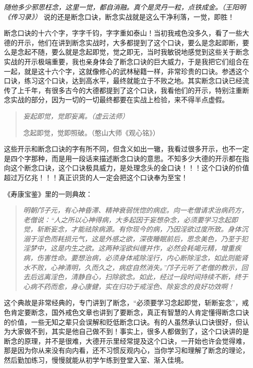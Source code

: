 \textit{随他多少邪思枉念，这里一觉，都自消融。真个是灵丹一粒，点铁成金。（王阳明《传习录》）} 说的还是断念口诀，断念实战就是这么干净利落，一觉，即胜！

断念口诀的十六个字，字字千钧，字字重如泰山！当初我戒色没多久，看了一些大德的开示，他们在讲到断念实战时，大多都提到了这个口诀，要么是念起即断，要么是念起不随，要么就是念起即觉，觉之即无，当时我敏锐地感觉到这些关于断念实战的开示极端重要，我也亲身体会了断念口诀的巨大威力，于是我把它们组合在一起，就是这十六个字，这就像修心的武林秘籍一样，非常珍贵的口诀。参透这个口诀，练习这个口诀，达到高水平，最终就能立于不败之地。其实断念口诀已经流传了上千年，有很多古今的大德都提到了这个口诀，我看他们的开示，特别注重断念实战的部分，因为一切的一切最终都要在实战上检验，来不得半点虚假。

\begin{quotation}\it
    妄起即觉，觉即妄离。（虚云法师）

    念起即觉，觉即照破。（憨山大师《观心铭》）
\end{quotation}

这些开示和断念口诀的字有所不同，但含义如出一辙，我看过很多开示，也不一定是四个字那种，而是用一段话来描述断念口诀的意思。不知多少大德的开示都在指向这个断念口诀，这个口诀极具威力，是处理念头的金口诀！！！这个口诀的价值超过万亿兆！！！真正识货的人一定会把这个口诀奉为至宝！

《寿康宝鉴》里的一则典故：

\begin{quote}\it
    明朝邝子元，有心神昏滞、精神衰弱恍惚的病症。向一老僧请求治病药方，老僧说：“人之所以心神得病，大多起因于妄想杂念，必须要学习念起即觉，斩断妄念，才能祛除病源。有你现今的病，乃因淫欲过度所致。身体沉溺于淫色而耗损元气，这是外感之欲，深夜睡眠前后，思念美色，乃至于犯淫梦中，这是内生之欲。这两种淫欲纠缠并作，必然会耗竭元精，增重疾病，伤害性命。要想治病，必须身体戒除淫行，内心断除淫念，如此则能肾水不败，心神清明，久而久之，病症自然消失。”邝子元听了老僧的教示，回去后远离淫色，清静自心，扫除欲念。如此，经过一段时间持续不断，终于心病不药而愈，身心康健，实在归功于戒淫色、除妄念的良好功效啊！
\end{quote}

这个典故是非常经典的，专门讲到了断念，“必须要学习念起即觉，斩断妄念”，戒色肯定要断念，国外戒色文章也讲到了要断念，真正有智慧的人肯定懂得断念口诀的价值，一些无知之辈只会误解和贬低断念口诀。有的人虽然承认口诀很好，但认为大家做不到，其实是他自己做不到！事实上，很多人都做到了，这个口诀讲的是断念的原理，并不是很难，大德开示里经常提及这个口诀，一开始也许会觉得难，那是因为你从来没有向内看，还不习惯反观内心，当你学习和理解了断念的理论，然后勤加练习，慢慢就能从初学乍练到登堂入室、渐入佳境。

